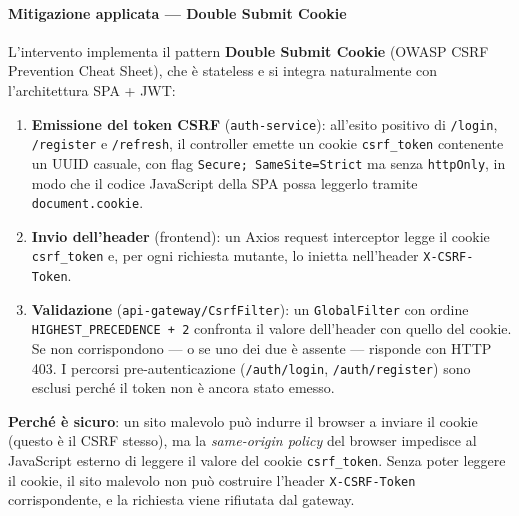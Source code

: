 ﻿\documentclass[a4paper,12pt]{report}
\begin{document}
\paragraph{Mitigazione applicata --- Double Submit Cookie}
L'intervento implementa il pattern \textbf{Double Submit Cookie} (OWASP CSRF Prevention Cheat
Sheet), che è stateless e si integra naturalmente con l'architettura SPA + JWT:

\begin{enumerate}
  \item \textbf{Emissione del token CSRF} (\texttt{auth-service}): all'esito positivo di
        \texttt{/login}, \texttt{/register} e \texttt{/refresh}, il controller emette un
        cookie \texttt{csrf\_token} contenente un UUID casuale, con flag
        \texttt{Secure; SameSite=Strict} ma senza \texttt{httpOnly}, in modo che il codice
        JavaScript della SPA possa leggerlo tramite \texttt{document.cookie}.
  \item \textbf{Invio dell'header} (frontend): un Axios request interceptor legge il cookie
        \texttt{csrf\_token} e, per ogni richiesta mutante, lo inietta nell'header
        \texttt{X-CSRF-Token}.
  \item \textbf{Validazione} (\texttt{api-gateway/CsrfFilter}): un \texttt{GlobalFilter}
        con ordine \texttt{HIGHEST\_PRECEDENCE + 2} confronta il valore dell'header con
        quello del cookie. Se non corrispondono --- o se uno dei due è assente --- risponde
        con HTTP 403. I percorsi pre-autenticazione (\texttt{/auth/login},
        \texttt{/auth/register}) sono esclusi perché il token non è ancora stato emesso.
\end{enumerate}

\textbf{Perché è sicuro}: un sito malevolo può indurre il browser a inviare il cookie
(questo è il CSRF stesso), ma la \emph{same-origin policy} del browser impedisce al
JavaScript esterno di leggere il valore del cookie \texttt{csrf\_token}. Senza poter leggere
il cookie, il sito malevolo non può costruire l'header \texttt{X-CSRF-Token} corrispondente,
e la richiesta viene rifiutata dal gateway.
\end{document}
